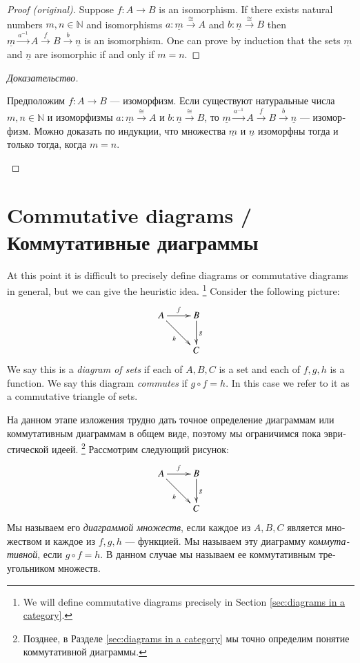 \documentclass{book}
\def\NN{{\mathbb N}}
\def\to{\rightarrow}
\def\taking{\colon}
\def\iso{\cong}
\def\m1{{-1}}
\def\ul{\underline}
\newcommand{\To}[1]{\xrightarrow{#1}}
\def\Set{{\bf Set}}
\theoremstyle{theoremENG}
\theoremstyle{lemmaENG}
\theoremstyle{propositionENG}
\theoremstyle{corollaryENG}
\theoremstyle{factENG}
\theoremstyle{remarkENG}
\theoremstyle{exampleENG}
\theoremstyle{warningENG}
\theoremstyle{questionENG}
\theoremstyle{guessENG}
\theoremstyle{answerENG}
\theoremstyle{constructionENG}
\theoremstyle{rulesENG}
\theoremstyle{excENG}
\theoremstyle{appENG}
\theoremstyle{definitionENG}
\theoremstyle{notationENG}
\theoremstyle{conjectureENG}
\theoremstyle{postulateENG}
\newenvironment{proofENG}{\begin{proof}[Proof (original)]}{\end{proof}}
\theoremstyle{theoremRUS}
\theoremstyle{lemmaRUS}
\theoremstyle{propositionRUS}
\theoremstyle{corollaryRUS}
\theoremstyle{factRUS}
\theoremstyle{remarkRUS}
\theoremstyle{exampleRUS}
\theoremstyle{warningRUS}
\theoremstyle{questionRUS}
\theoremstyle{guessRUS}
\theoremstyle{answerRUS}
\theoremstyle{constructionRUS}
\theoremstyle{rulesRUS}
\theoremstyle{excRUS}
\theoremstyle{appRUS}
\theoremstyle{definitionRUS}
\theoremstyle{notationRUS}
\theoremstyle{conjectureRUS}
\theoremstyle{postulateRUS}
\newenvironment{proofRUS}{\begin{proof}[Доказательство]}{\end{proof}}
\begin{document}
\begin{english}
\begin{proofENG}
Suppose $f\taking A\to B$ is an isomorphism. If there exists natural numbers $m,n\in\NN$ and isomorphisms $a\taking\ul{m}\To\iso A$ and $b\taking\ul{n}\To\iso B$ then $\ul{m}\To{a^\m1}A\To{f}B\To{b}\ul{n}$ is an isomorphism. One can prove by induction that the sets $\ul{m}$ and $\ul{n}$ are isomorphic if and only if $m=n$. 
\end{proofENG}

\begin{proofRUS}
\begin{russian}
Предположим $f\taking A\to B$ — изоморфизм. Если существуют натуральные числа $m,n\in\NN$ и изоморфизмы $a\taking\ul{m}\To\iso A$ и $b\taking\ul{n}\To\iso B$, то $\ul{m}\To{a^\m1}A\To{f}B\To{b}\ul{n}$ — изоморфизм. Можно доказать по индукции, что множества $\ul{m}$ и $\ul{n}$ изоморфны тогда и только тогда, когда $m=n$. 
\end{russian}
\end{proofRUS}


\section{Commutative diagrams / Коммутативные диаграммы}\label{sec:comm diag}
\addtocounter{subsection}{1}\setcounter{subsubsection}{0}

At this point it is difficult to precisely define diagrams or commutative diagrams in general, but we can give the heuristic idea.
\footnote{We will define commutative diagrams precisely in Section \ref{sec:diagrams in a category}.}
Consider the following picture: 
\begin{align}\label{dia:triangle}
\xymatrix{A\ar[r]^f\ar[rd]_h&B\ar[d]^g\\&C}
\end{align}
We say this is a {\em diagram of sets}\index{diagram!in $\Set$} if each of $A,B,C$ is a set and each of $f,g,h$ is a function. We say this diagram {\em commutes} if $g\circ f = h$. In this case we refer to it as a commutative triangle of sets.

\begin{russian} 
На данном этапе изложения трудно дать точное определение диаграммам или коммутативным диаграммам в общем виде, поэтому мы ограничимся пока эвристической идеей.
\footnote{Позднее, в Разделе \ref{sec:diagrams in a category} мы точно определим понятие коммутативной диаграммы.}
Рассмотрим следующий рисунок: 
\begin{align}\label{dia:triangle}
\xymatrix{A\ar[r]^f\ar[rd]_h&B\ar[d]^g\\&C}
\end{align}
Мы называем его {\em диаграммой множеств}\index{diagram!in $\Set$}, если каждое из $A,B,C$ является множеством и каждое из $f,g,h$ — функцией. Мы называем эту диаграмму {\em коммутативной}, если $g\circ f = h$. В данном случае мы называем ее коммутативным треугольником множеств.
\end{russian}


\end{english}
\end{document}
